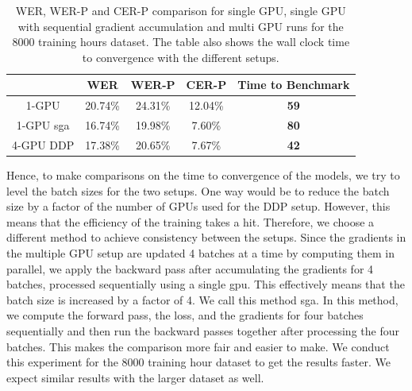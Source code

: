 \begin{table}[ht]
\centering
\begin{tabular}{c | c c c | c }
\hline
     & WER & WER-P & CER-P & Time to Benchmark\\
 \hline
  1-GPU & 20.74\% & 24.31\% & 12.04\% & \textbf{59} \\
  1-GPU \acrshort{sga} & 16.74\% & 19.98\% & 7.60\% & \textbf{80} \\
  4-GPU DDP & 17.38\% & 20.65\% & 7.67\% & \textbf{42} \\
 \hline
\end{tabular}
\caption{\label{table:wer_ddp_grad} WER, WER-P and CER-P comparison for single GPU, single GPU with sequential gradient accumulation and multi GPU runs for the 8000 training hours dataset. The table also shows the wall clock time to convergence with the different setups.}
\end{table}

Hence, to make comparisons on the time to convergence of the models, we try to level the batch sizes for the two setups. One way would be to reduce the batch size by a factor of the number of GPUs used for the DDP setup. However, this means that the efficiency of the training takes a hit. Therefore, we choose a different method to achieve consistency between the setups. Since the gradients in the multiple GPU setup are updated 4 batches at a time by computing them in parallel, we apply the backward pass after accumulating the gradients for 4 batches, processed sequentially using a single \acrshort{gpu}. This effectively means that the batch size is increased by a factor of 4. We call this method \acrfull{sga}. In this method, we compute the forward pass, the loss, and the gradients for four batches sequentially and then run the backward passes together after processing the four batches. This makes the comparison more fair and easier to make. We conduct this experiment for the 8000 training hour dataset to get the results faster. We expect similar results with the larger dataset as well. 

